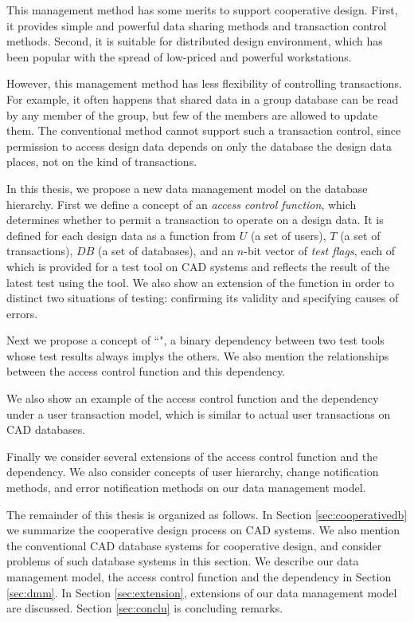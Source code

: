 This management method has some merits to support cooperative design.
First, it provides simple and powerful data sharing methods and 
transaction control methods.
Second, it is suitable for distributed design environment, which has
been popular with the spread of low-priced and powerful
workstations.

However, this management method has less flexibility of controlling
transactions.
For example, it often happens that shared data in a group database
can be read by any member of the group, but few of the members are
allowed to update them.
The conventional method cannot support such a transaction control, since 
permission to access design data depends on only the 
database the design data places, not on the kind of transactions.

In this thesis, we propose a new data management model on the database
hierarchy.
First we define a concept of an {\em access control function}, which 
determines whether to permit a transaction to operate on a design data.
It is defined for each design data as a function from $U$ (a set of 
users), $T$ (a set of transactions), $DB$ (a set of databases), and 
an $n$-bit vector of {\em test flags}, each of 
which is provided for a test tool on CAD systems and reflects the 
result of the latest test using the tool.
We also show an extension of the function in order to distinct two
situations of testing: confirming its validity and specifying causes of
errors.

Next we propose a concept of ``", a binary 
dependency between two test tools whose test results always implys the others.
We also mention the relationships between the access control function
and this dependency.

We also show an example of the access control function and the \testtool
dependency under a user transaction model, which is similar to actual 
user transactions on CAD databases.

Finally we consider several extensions of the access control function
and the \testtool dependency.
We also consider concepts of user hierarchy, change notification
methods, and error notification methods on our data management model.

The remainder of this thesis is organized as follows.
In Section \ref{sec:cooperativedb} we summarize the cooperative design
process on CAD systems.
We also mention the conventional CAD database systems for cooperative 
design, and consider problems of such database systems in this section.
We describe our data management model, the access control function and
the \testtool dependency in Section \ref{sec:dmm}.
In Section \ref{sec:extension}, extensions of our data management model are
discussed.
Section \ref{sec:conclu} is concluding remarks.

